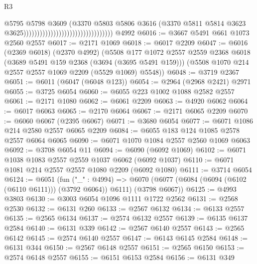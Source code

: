 \begin{lexlean}{R3}
\begin{coremodule}
                                                                  @5795
                                                                  @5798
                                                                  @3609
                                                                  (@3370
                                                                    @5803
                                                                    @5806
                                                                    @3616
                                                                    (@3370
                                                                      @5811
                                                                      @5814
                                                                      @3623
                                                                      @3625)))))))))))))))))))))))))))))))))
    @4992
@6016 := @3667 @5491 @661 @1073 @2560 @2557
@6017 := @2171 @1069
@6018 := @6017 @2209
@6047 := @6016
    (@2369 @6018)
    (@2370 @4992)
    (@5508
      @177
      @1072
      @2557
      @2559
      @2368
      @6018
      (@3689 @5491 @159 @2368 (@3694 (@3695 @5491 @159)))
      (@5508 @1070 @214 @2557 @2557 @1069 @2209 (@5529 @1069) @5548))
@6048 := @3719 @2367
@6051 := @6011 (@6047 (@6048 @123))
@6054 := @2964 (@2968 @2421) @2971
@6055 := @3725 @6054
@6060 := @6055 @223 @1002 @1088 @2582 @2557
@6061 := @2171 @1080
@6062 := @6061 @2209
@6063 := @4920 @6062
@6064 := @6017 @6063
@6065 := @2170 @6064
@6067 := @2171 @6065 @2209
@6070 := @6060 @6067 (@2395 @6067)
@6071 := @3680 @6054
@6077 := @6071 @1086 @214 @2580 @2557 @6065 @2209
@6084 := @6055 @183 @124 @1085 @2578 @2557 @6064 @6065
@6090 := @6071 @1070 @1084 @2557 @2560 @1069 @6063
@6092 := @3708 @6054 @11
@6094 := @6090 (@6092 @1069)
@6102 := @6071 @1038 @1083 @2557 @2559 @1037 @6062 (@6092 @1037)
@6110 := @6071 @1081 @214 @2557 @2557 @1080 @2209 (@6092 @1080)
@6111 := @3714 @6054
@6124 := @6051
    (fun ("_" : @4994) =>
    @6070 (@6077 (@6084 (@6094 (@6102 (@6110 @6111))) (@3792 @6064)) @6111) (@3798 @6067))
@6125 := @4993 @3803
@6130 := @3003 @6054 @1096 @1111 @1722 @2562
@6131 := @2568 @2530
@6132 := @6131 @260
@6133 := @2567 @6132
@6134 := @6133 @2557
@6135 := @2565 @6134
@6137 := @2574 @6132 @2557
@6139 := @6135 @6137 @2584
@6140 := @6131 @339
@6142 := @2567 @6140 @2557
@6143 := @2565 @6142
@6145 := @2574 @6140 @2557
@6147 := @6143 @6145 @2584
@6148 := @6131 @344
@6150 := @2567 @6148 @2557
@6151 := @2565 @6150
@6153 := @2574 @6148 @2557
@6155 := @6151 @6153 @2584
@6156 := @6131 @349

\end{coremodule}
\end{lexlean}
